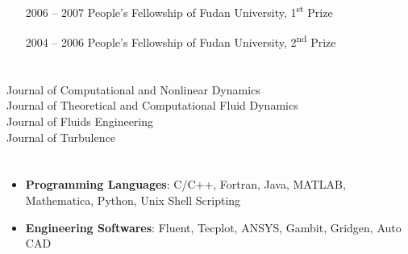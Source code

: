 \documentclass[11pt,letter]{article}
\begin{document}
\section*{}
\begin{adjustwidth}{5.5em}{0pt}
\begin{itemize}
\item [2006 -- 2007] People's Fellowship of Fudan University, 1\textsuperscript{st} Prize
\item [2004 -- 2006] People's Fellowship of Fudan University, 2\textsuperscript{nd} Prize
\end{itemize}
\end{adjustwidth}

\section*{}%
\begin{adjustwidth}{2em}{0pt}
Journal of Computational and Nonlinear Dynamics\\
Journal of Theoretical and Computational Fluid Dynamics\\
Journal of Fluids Engineering\\
Journal of Turbulence
\end{adjustwidth}


\section*{}
\begin{itemize}
  \item \textbf{Programming Languages}: C/C++, Fortran,  Java, MATLAB, Mathematica,   Python, Unix Shell Scripting
  \item \textbf{Engineering Softwares}: Fluent, Tecplot, ANSYS, Gambit, Gridgen, Auto CAD 
\end{itemize}
\end{document}
